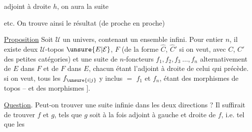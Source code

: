 adjoint à droite $h$, on aura la suite 


etc. On trouve ainsi le résultat (de proche en proche)

\uline{Proposition} Soit $\mathcal U$ un univers,  contenant
un ensemble infini. Pour  entier $n$,
il existe deux $\mathcal U$-topos $\unsure{E|\mathcal E}$, $F$
(de la forme $\hat C$, $\hat C'$ si on veut, avec
$C$, $C'$ des petites catégories) et une
suite de $n$-foncteurs  $f_1,f_2,f_3\ \ldots,f_n$
alternativement de $E$ dans $F$ et de $F$ dans $E$,
chacun étant l'adjoint à droite de celui
qui précède.  si on veut, tous les $f_{\unsure{i|j}}$
y inclus $=$ $f_1$ et $f_n$, étant des morphismes
de topos -- et \unsure{$=$} des morphismes ].

\uline{Question}. Peut-on trouver une suite infinie
dans les deux directions ? Il suffirait de
trouver $f$ et $g$, tels que $g$ soit à la fois adjoint
à gauche et  droite de $f$, i.e. tel que les

